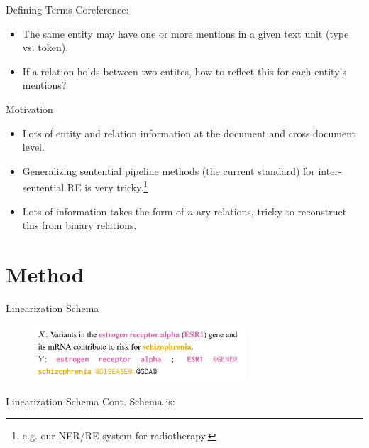 \documentclass[usenames,dvipsnames,pdf]{beamer}
\begin{document}
        \begin{frame}{Defining Terms}
          Coreference:
          \begin{itemize}
          \item
            The same entity may have one or more mentions in a given text unit (type vs. token).
          \item
            If a relation holds between two entites, how to reflect this for each entity's mentions?
          \end{itemize}
        \end{frame}
        
        \begin{frame}{Motivation}
          \begin{itemize}
          \item
            Lots of entity and relation information at the document and cross document level.
          \item
            Generalizing sentential pipeline methods (the current standard) for inter-sentential RE is very tricky.\footnote{e.g. our NER/RE system for radiotherapy.}
          \item
            Lots of information takes the form of $n$-ary relations, tricky to reconstruct this from binary relations.
          \end{itemize}
        \end{frame}
        
        \section{Method}

        \begin{frame}{Linearization Schema}
          \begin{figure}
          \includegraphics[width=0.7\textwidth,height=0.7\textheight,keepaspectratio]{linearization} 
          \end{figure}
        \end{frame}

        \begin{frame}{Linearization Schema Cont.}
          Schema is:

          
          \begin{adjustbox}{varwidth=\linewidth}%
            \small{}


            \small{}


            \small{}
            \end{adjustbox}
        \end{frame}
\end{document}
